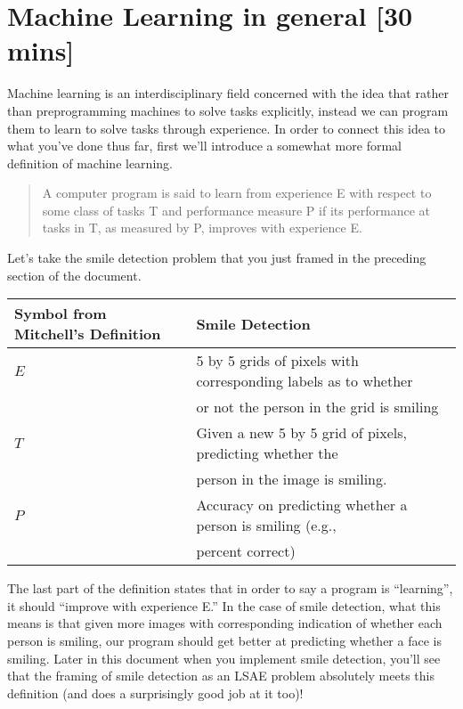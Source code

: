 \section{Machine Learning in general [30 mins]}

Machine learning is an interdisciplinary field concerned with the idea that rather than preprogramming machines to solve tasks explicitly, instead we can program them to learn to solve tasks through experience.  In order to connect this idea to what you've done thus far, first we'll introduce a somewhat more formal definition of machine learning.

\begin{quote}
A computer program is said to learn from experience E with respect to some class of tasks T and performance measure P if its performance at tasks in T, as measured by P, improves with experience E.
\end{quote}

Let's take the smile detection problem that you just framed in the preceding section of the document.

\vspace{1em}

\begin{tabular}{l | l}
Symbol from Mitchell's Definition & Smile Detection \\
\hline
$E$ & 5 by 5 grids of pixels with corresponding labels as to whether\\ &or not the person in the grid is smiling \\
\hline
$T$ & Given a new 5 by 5 grid of pixels, predicting whether the \\&  person in the image is smiling. \\
\hline
$P$ & Accuracy on predicting whether a person is smiling (e.g., \\&percent  correct)
\end{tabular}

The last part of the definition states that in order to say a program is  ``learning'', it should ``improve with experience E.''  In the case of smile detection, what this means is that given more images with corresponding indication of whether each person is smiling, our program should get better at predicting whether a face is smiling.  Later in this document when you implement smile detection, you'll see that the framing of smile detection as an LSAE problem absolutely meets this definition (and does a surprisingly good job at it too)!

